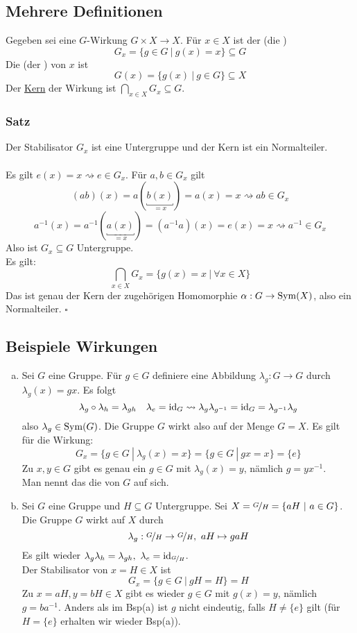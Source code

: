 \subsection{Mehrere Definitionen}
\label{sub:mehrere_def}
Gegeben sei eine $G$-Wirkung $G\times X\to X$. Für $x\in X$ ist der  (die )
\[G_x=\{g\in G~|~g(x)=x \}\subseteq G \]
Die  (der ) von $x$ ist 
\[G(x)=\{g(x)~|~g\in G \}\subseteq X \]
Der \uline{Kern} der Wirkung ist $\bigcap\limits_{x\in X}G_x\subseteq G$.

\subsubsection*{Satz}
Der Stabilisator $G_x$ ist eine Untergruppe und der Kern ist ein Normalteiler.\\

\\
Es gilt $e(x)=x \rightsquigarrow e\in G_x$. Für $a,b\in G_x$ gilt \[(ab)(x)=a(\underbracket{b(x)}_{=x})=a(x)=x \rightsquigarrow ab\in G_x\]
\[a^{-1}(x)=a^{-1}(\underbracket{a(x)}_{=x})=(a^{-1}a)(x)=e(x)=x \rightsquigarrow a^{-1}\in G_x \]
Also ist $G_x\subseteq G$ Untergruppe.\\
Es gilt: \[\bigcap\limits_{x\in X}G_x=\{g(x)=x~|~\forall x\in X \} \]
Das ist genau der Kern der zugehörigen Homomorphie $\alpha:G\to \operatorname{Sym}(X)$, also ein Normalteiler.
\hfill $\square$

\subsection{Beispiele Wirkungen}
\label{sub:bsp_wirkungen}
\begin{enumerate}[(a)]
	\item Sei $G$ eine Gruppe. Für $g\in G$ definiere eine Abbildung $\lambda_g:G\to G$ durch $\lambda_g(x)=gx$. Es folgt
	\[\lambda_g\circ\lambda_h=\lambda_{gh} \quad \lambda_e=\operatorname{id}_G \rightsquigarrow \lambda_g\lambda_{g^{-1}}=\operatorname{id}_G=\lambda_{g^{-1}}\lambda_g \]
	also $\lambda_g\in \operatorname{Sym}(G)$. Die Gruppe $G$ wirkt also auf der Menge $G=X$. Es gilt für die Wirkung:
	\[G_x=\{g\in G~|~\lambda_g(x)=x \}=\{g\in G~|~gx=x \}=\{e\} \]
	Zu $x,y\in G$ gibt es genau ein $g\in G$ mit $\lambda_g(x)=y$, nämlich $g=yx^{-1}$.\\
	Man nennt das die  von $G$ auf sich.
	\item Sei $G$ eine Gruppe und $H\subseteq G$ Untergruppe. Sei $X=\nicefrac{G}{H}=\{aH~|~a\in G \}$. Die Gruppe $G$ wirkt auf $X$ durch \[\lambda_g:\nicefrac{G}{H}\to \nicefrac{G}{H},~aH\mapsto gaH \]
	Es gilt wieder $\lambda_g\lambda_h=\lambda_{gh},~\lambda_e=\operatorname{id}_{\nicefrac{G}{H}}$.\\
	Der Stabilisator von $x=H\in X$ ist \[G_x=\{g\in G~|~gH=H \}=H \]
	Zu $x=aH,y=bH\in X$ gibt es wieder $g\in G$ mit $g(x)=y$, nämlich $g=ba^{-1}$. Anders als im Bsp(a) ist $g$ nicht eindeutig, falls $H\not= \{e\}$ gilt (für $H=\{e\}$ erhalten wir wieder Bsp(a)). 
\end{enumerate}

